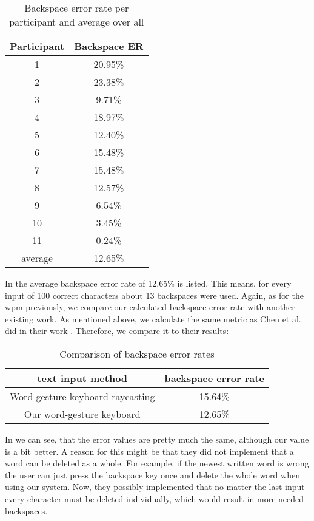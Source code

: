 \fi
\begin{table}[H]
    \centering
    \caption{Backspace error rate per participant and average over all}
    \begin{tabular}{cc} \toprule
        Participant&Backspace ER\\ \midrule
        1 & 20.95\%\\
        2 & 23.38\%\\
        3 & 9.71\%\\
        4 & 18.97\%\\
        5 & 12.40\%\\
        6 & 15.48\%\\
        7 & 15.48\%\\
        8 & 12.57\%\\
        9 & 6.54\%\\
        10 & 3.45\%\\
        11 & 0.24\%\\
        \midrule
        average & 12.65\%\\
        \bottomrule
    \end{tabular}
    \label{tab:backspace_er}
\end{table}
In  the average backspace error rate of 12.65\% is listed. This means, for every input of 100 correct characters about 13 backspaces were used. Again, as for the wpm previously, we compare our calculated backspace error rate with another existing work. As mentioned above, we calculate the same metric as Chen et al. did in their work \cite{10.1145/3290607.3312762}. Therefore, we compare it to their results:
\begin{table}[H]
    \centering
    \caption{Comparison of backspace error rates}
    \begin{tabular}{cc} \toprule
        text input method&backspace error rate\\ \midrule
        Word-gesture keyboard raycasting&15.64\%\\
        Our word-gesture keyboard&12.65\%\\
        \bottomrule
    \end{tabular}
    \label{tab:error_backspace_compare}
\end{table}
In  we can see, that the error values are pretty much the same, although our value is a bit better. A reason for this might be that they did not implement that a word can be deleted as a whole. For example, if the newest written word is wrong the user can just press the backspace key once and delete the whole word when using our system. Now, they possibly implemented that no matter the last input every character must be deleted individually, which would result in more needed backspaces.

